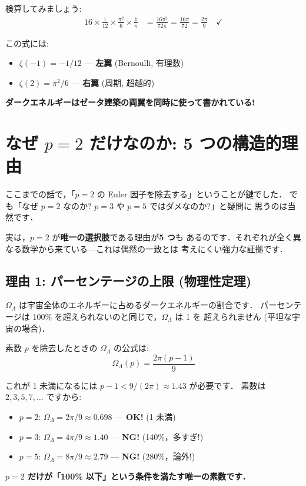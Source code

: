 \documentclass[11pt,a4paper]{article}
\begin{document}
検算してみましょう:
\begin{align*}
16 \times \frac{1}{12} \times \frac{\pi^2}{6} \times \frac{1}{\pi}
&= \frac{16\pi^2}{72\pi} = \frac{16\pi}{72} = \frac{2\pi}{9} \quad \checkmark
\end{align*}

この式には:
\begin{itemize}
\item $\zeta(-1) = -1/12$ --- \textbf{左翼} (Bernoulli, 有理数)
\item $\zeta(2) = \pi^2/6$ --- \textbf{右翼} (周期, 超越的)
\end{itemize}

\textbf{ダークエネルギーはゼータ建築の両翼を同時に使って書かれている!}

\section{なぜ $p = 2$ だけなのか: 5 つの構造的理由}

ここまでの話で，「$p = 2$ の Euler 因子を除去する」ということが鍵でした．
でも「なぜ $p = 2$ なのか? $p = 3$ や $p = 5$ ではダメなのか?」と疑問に
思うのは当然です．

実は，$p = 2$ が\textbf{唯一の選択肢}である理由が\textbf{5 つ}も
あるのです．それぞれが全く異なる数学から来ている---これは偶然の一致とは
考えにくい強力な証拠です．

\subsection{理由 1: パーセンテージの上限 (物理性定理)}

$\Omega_\Lambda$ は宇宙全体のエネルギーに占めるダークエネルギーの割合です．
パーセンテージは 100\% を超えられないのと同じで，$\Omega_\Lambda$ は 1 を
超えられません (平坦な宇宙の場合)．

素数 $p$ を除去したときの $\Omega_\Lambda$ の公式は:
\begin{equation*}
\Omega_\Lambda(p) = \frac{2\pi(p-1)}{9}
\end{equation*}

これが 1 未満になるには $p - 1 < 9/(2\pi) \approx 1.43$ が必要です．
素数は $2, 3, 5, 7, \ldots$ ですから:

\begin{tcolorbox}[colback=green!5,colframe=green!60!black]
\begin{itemize}
\item $p = 2$: $\Omega_\Lambda = 2\pi/9 \approx 0.698$ --- \textbf{OK!} (1 未満)
\item $p = 3$: $\Omega_\Lambda = 4\pi/9 \approx 1.40$ --- \textbf{NG!} (140\%，多すぎ!)
\item $p = 5$: $\Omega_\Lambda = 8\pi/9 \approx 2.79$ --- \textbf{NG!} (280\%，論外!)
\end{itemize}
\textbf{$p = 2$ だけが「100\% 以下」という条件を満たす唯一の素数です．}
\end{tcolorbox}
\end{document}
